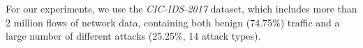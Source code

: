 \documentclass[conference]{IEEEtran}
\begin{document}
For our experiments, we use the \textit{CIC-IDS-2017} \cite{sharafaldin_toward_2018} dataset, which includes more than 2 million flows of network data, containing both benign (74.75\%) traffic and a large number of different attacks (25.25\%, 14 attack types). %
\end{document}
